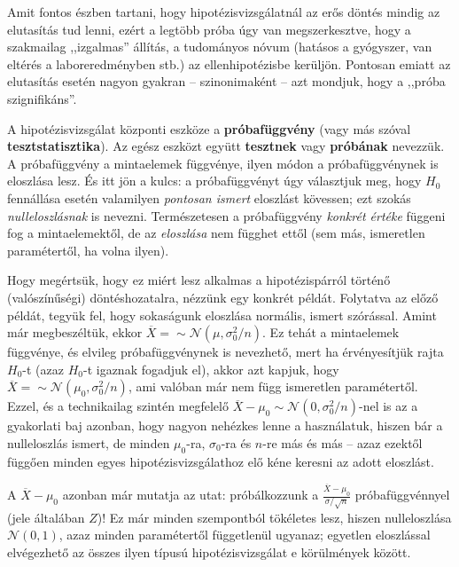 \documentclass[]{book}
\begin{document}
Amit fontos észben tartani, hogy hipotézisvizsgálatnál az erős döntés mindig az elutasítás tud lenni, ezért a legtöbb próba úgy van megszerkesztve, hogy a szakmailag ,,izgalmas'' állítás, a tudományos nóvum (hatásos a gyógyszer, van eltérés a laboreredményben stb.) az ellenhipotézisbe kerüljön. Pontosan emiatt az elutasítás esetén nagyon gyakran -- szinonimaként -- azt mondjuk, hogy a ,,próba szignifikáns''.

A hipotézisvizsgálat központi eszköze a \textbf{próbafüggvény} (vagy más szóval \textbf{tesztstatisztika}). Az egész eszközt együtt \textbf{tesztnek} vagy \textbf{próbának} nevezzük. A próbafüggvény a mintaelemek függvénye, ilyen módon a próbafüggvénynek is eloszlása lesz. És itt jön a kulcs: a próbafüggvényt úgy választjuk meg, hogy \(H_0\) fennállása esetén valamilyen \emph{pontosan ismert} eloszlást kövessen; ezt szokás \emph{nulleloszlásnak} is nevezni. Természetesen a próbafüggvény \emph{konkrét értéke} függeni fog a mintaelemektől, de az \emph{eloszlása} nem függhet ettől (sem más, ismeretlen paramétertől, ha volna ilyen).

Hogy megértsük, hogy ez miért lesz alkalmas a hipotézispárról történő (valószínűségi) döntéshozatalra, nézzünk egy konkrét példát. Folytatva az előző példát, tegyük fel, hogy sokaságunk eloszlása normális, ismert szórással. Amint már megbeszéltük, ekkor \(\overline{X}= \sim \mathcal{N}\left(\mu,\sigma_0^2/n\right)\). Ez tehát a mintaelemek függvénye, és elvileg próbafüggvénynek is nevezhető, mert ha érvényesítjük rajta \(H_0\)-t (azaz \(H_0\)-t igaznak fogadjuk el), akkor azt kapjuk, hogy \(\overline{X}= \sim \mathcal{N}\left(\mu_0,\sigma_0^2/n\right)\), ami valóban már nem függ ismeretlen paramétertől. Ezzel, és a technikailag szintén megfelelő \(\overline{X}-\mu_0\sim \mathcal{N}\left(0,\sigma_0^2/n\right)\)-nel is az a gyakorlati baj azonban, hogy nagyon nehézkes lenne a használatuk, hiszen bár a nulleloszlás ismert, de minden \(\mu_0\)-ra, \(\sigma_0\)-ra és \(n\)-re más és más -- azaz ezektől függően minden egyes hipotézisvizsgálathoz elő kéne keresni az adott eloszlást.

A \(\overline{X}-\mu_0\) azonban már mutatja az utat: próbálkozzunk a \(\frac{\overline{X}-\mu_0}{\sigma/\sqrt{n}}\) próbafüggvénnyel (jele általában \(Z\))! Ez már minden szempontból tökéletes lesz, hiszen nulleloszlása \(\mathcal{N}\left(0,1\right)\), azaz minden paramétertől függetlenül ugyanaz; egyetlen eloszlással elvégezhető az összes ilyen típusú hipotézisvizsgálat e körülmények között.
\end{document}
